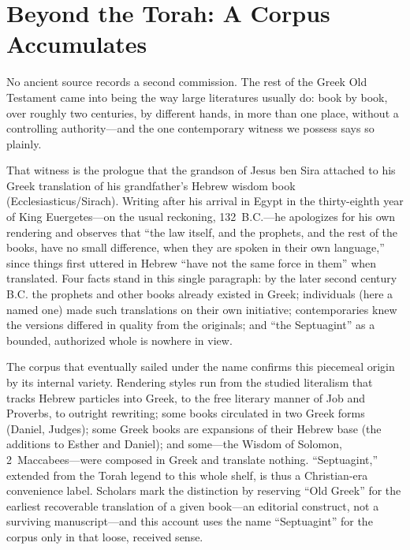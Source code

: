 \section{Beyond the Torah: A Corpus Accumulates}

No ancient source records a second commission. The rest of the Greek Old
Testament came into being the way large literatures usually do: book by
book, over roughly two centuries, by different hands, in more than one
place, without a controlling authority---and the one contemporary witness we
possess says so plainly.

That witness is the prologue that the grandson of Jesus ben Sira attached
to his Greek translation of his grandfather's Hebrew wisdom book
(Ecclesiasticus/Sirach). Writing after his arrival in Egypt in the
thirty-eighth year of King Euergetes---on the usual reckoning,
132~B.C.---he apologizes for his own rendering and observes that ``the law
itself, and the prophets, and the rest of the books, have no small
difference, when they are spoken in their own language,'' since things
first uttered in Hebrew ``have not the same force in them'' when
translated. Four facts stand in this
single paragraph: by the later second century B.C. the prophets and other
books already existed in Greek; individuals (here a named one) made such
translations on their own initiative; contemporaries knew the versions
differed in quality from the originals; and ``the Septuagint'' as a bounded,
authorized whole is nowhere in view.

The corpus that eventually sailed under the name confirms this piecemeal
origin by its internal variety. Rendering styles run from the studied
literalism that tracks Hebrew particles into Greek, to the free literary
manner of Job and Proverbs, to outright rewriting; some books circulated in
two Greek forms (Daniel, Judges); some Greek books are expansions of their
Hebrew base (the additions to Esther and Daniel); and some---the Wisdom of
Solomon, 2~Maccabees---were composed in Greek and translate
nothing. ``Septuagint,'' extended from the Torah legend to this whole
shelf, is thus a Christian-era convenience label. Scholars mark the
distinction by reserving ``Old Greek'' for the earliest recoverable
translation of a given book---an editorial construct, not a surviving
manuscript---and this account uses the name ``Septuagint'' for the corpus
only in that loose, received sense.
